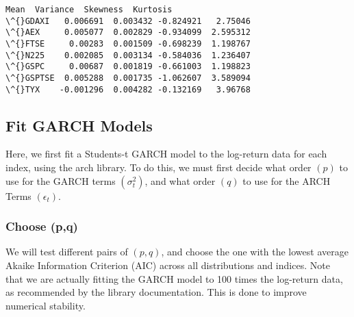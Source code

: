 \documentclass[11pt]{article}
\begin{document}
    
    \begin{Verbatim}[commandchars=\\\{\}]
             Mean  Variance  Skewness  Kurtosis
\^{}GDAXI   0.006691  0.003432 -0.824921   2.75046
\^{}AEX     0.005077  0.002829 -0.934099  2.595312
\^{}FTSE     0.00283  0.001509 -0.698239  1.198767
\^{}N225    0.002085  0.003134 -0.584036  1.236407
\^{}GSPC     0.00687  0.001819 -0.661003  1.198823
\^{}GSPTSE  0.005288  0.001735 -1.062607  3.589094
\^{}TYX    -0.001296  0.004282 -0.132169   3.96768
    \end{Verbatim}

    
    \subsection{Fit GARCH Models}\label{fit-garch-models}

Here, we first fit a Students-t GARCH model to the log-return data for
each index, using the arch library. To do this, we must first decide
what order \((p)\) to use for the GARCH terms \((\sigma^2_t)\), and what
order \((q)\) to use for the ARCH Terms \((\epsilon_t)\).

    \subsubsection{Choose (p,q)}\label{choose-pq}

We will test different pairs of \((p,q)\), and choose the one with the
lowest average Akaike Information Criterion (AIC) across all
distributions and indices. Note that we are actually fitting the GARCH
model to 100 times the log-return data, as recommended by the library
documentation. This is done to improve numerical stability.
\end{document}

